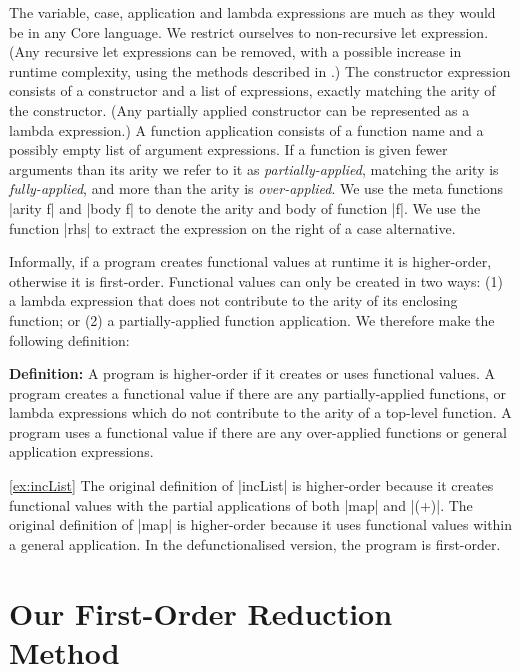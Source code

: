 \documentclass[preprint]{sigplanconf}
\newenvironment{definition}
    {\smallskip
     \noindent\textbf{Definition:}}
    {\noexample}
\begin{document}
The variable, case, application and lambda expressions are much as they would be in any Core language. We restrict ourselves to non-recursive let expression. (Any recursive let expressions can be removed, with a possible increase in runtime complexity, using the methods described in \cite{me:thesis}.) The constructor expression consists of a constructor and a list of expressions, exactly matching the arity of the constructor. (Any partially applied constructor can be represented as a lambda expression.) A function application consists of a function name and a possibly empty list of argument expressions. If a function is given fewer arguments than its arity we refer to it as \textit{partially-applied}, matching the arity is \textit{fully-applied}, and more than the arity is \textit{over-applied}. We use the meta functions |arity f| and |body f| to denote the arity and body of function |f|. We use the function |rhs| to extract the expression on the right of a case alternative.

Informally, if a program creates functional values at runtime it is higher-order, otherwise it is first-order. Functional values can only be created in two ways: (1) a lambda expression that does not contribute to the arity of its enclosing function; or (2) a partially-applied function application. We therefore make the following definition:

\begin{definition}
A program is higher-order if it creates or uses functional values. A program creates a functional value if there are any partially-applied functions, or lambda expressions which do not contribute to the arity of a top-level function. A program uses a functional value if there are any over-applied functions or general application expressions.
\end{definition}

\begin{examplerevisit}{\ref{ex:incList}}
The original definition of |incList| is higher-order because it creates functional values with the partial applications of both |map| and |(+)|. The original definition of |map| is higher-order because it uses functional values within a general application. In the defunctionalised version, the program is first-order.
\end{examplerevisit}

\section{Our First-Order Reduction Method}
\label{sec:overview}
\end{document}
